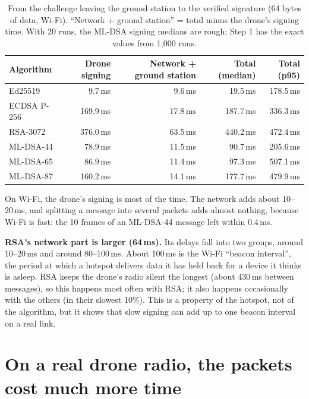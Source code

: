 \documentclass[10pt,a4paper]{article}
\begin{document}
\begin{table}[H]
\centering\small
\begin{tabularx}{0.9\textwidth}{@{}l RRRR@{}}
\toprule
Algorithm & Drone signing & Network + ground station & Total (median) & Total (p95) \\
\midrule
Ed25519     & 9.7\,ms   & 9.6\,ms  & 19.5\,ms  & 178.5\,ms \\
ECDSA P-256 & 169.9\,ms & 17.8\,ms & 187.7\,ms & 336.3\,ms \\
RSA-3072    & 376.0\,ms & 63.5\,ms & 440.2\,ms & 472.4\,ms \\
ML-DSA-44   & 78.9\,ms  & 11.5\,ms & 90.7\,ms  & 205.6\,ms \\
ML-DSA-65   & 86.9\,ms  & 11.4\,ms & 97.3\,ms  & 507.1\,ms \\
ML-DSA-87   & 160.2\,ms & 14.1\,ms & 177.7\,ms & 479.9\,ms \\
\bottomrule
\end{tabularx}
\caption{From the challenge leaving the ground station to the verified signature (64 bytes of data,
Wi-Fi). ``Network + ground station'' = total minus the drone's signing time. With 20 runs, the ML-DSA
signing medians are rough; Step 1 has the exact values from 1,000 runs.}
\end{table}

On Wi-Fi, the drone's signing is most of the time. The network adds about 10--20\,ms, and splitting
a message into several packets adds almost nothing, because Wi-Fi is fast: the 10 frames of an
ML-DSA-44 message left within 0.4\,ms.

\textbf{RSA's network part is larger (64\,ms).} Its delays fall into two groups, around 10--20\,ms
and around 80--100\,ms. About 100\,ms is the Wi-Fi ``beacon interval'', the period at which a hotspot
delivers data it has held back for a device it thinks is asleep. RSA keeps the drone's radio silent
the longest (about 430\,ms between messages), so this happens most often with RSA; it also happens
occasionally with the others (in their slowest 10\%). This is a property of the hotspot, not of the
algorithm, but it shows that slow signing can add up to one beacon interval on a real link.

\section{On a real drone radio, the packets cost much more time}
\end{document}
